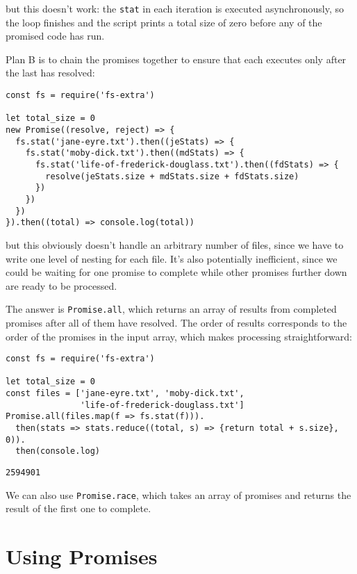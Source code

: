 \noindent
but this doesn't work:
the \texttt{stat} in each iteration is executed asynchronously,
so the loop finishes and the script prints a total size of zero
before any of the promised code has run.

Plan B is to chain the promises together
to ensure that each executes only after the last has resolved:

\begin{verbatim}
const fs = require('fs-extra')

let total_size = 0
new Promise((resolve, reject) => {
  fs.stat('jane-eyre.txt').then((jeStats) => {
    fs.stat('moby-dick.txt').then((mdStats) => {
      fs.stat('life-of-frederick-douglass.txt').then((fdStats) => {
        resolve(jeStats.size + mdStats.size + fdStats.size)
      })
    })
  })
}).then((total) => console.log(total))
\end{verbatim}

\noindent
but this obviously doesn't handle an arbitrary number of files,
since we have to write one level of nesting for each file.
It's also potentially inefficient,
since we could be waiting for one promise to complete
while other promises further down are ready to be processed.

The answer is \texttt{Promise.all},
which returns an array of results from completed promises after all of them have resolved.
The order of results corresponds to the order of the promises in the input array,
which makes processing straightforward:

\begin{verbatim}
const fs = require('fs-extra')

let total_size = 0
const files = ['jane-eyre.txt', 'moby-dick.txt',
               'life-of-frederick-douglass.txt']
Promise.all(files.map(f => fs.stat(f))).
  then(stats => stats.reduce((total, s) => {return total + s.size}, 0)).
  then(console.log)
\end{verbatim}

\begin{verbatim}
2594901
\end{verbatim}

We can also use \texttt{Promise.race},
which takes an array of promises and returns the result of the first one to complete.

\section{Using Promises}\label{s:promises-usage}

